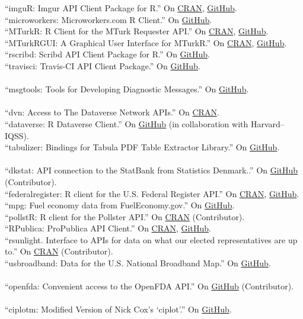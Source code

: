 \documentclass[12pt]{article}
\newcommand{\topic}[1]{\pagebreak[3]\indent {\color{lg}{\footnotesize #1 }}\\}
\newcommand{\entry}[1]{\indent {\color{lg}\guillemotright}\hspace{2pt}#1\vspace{.25em}\\}
\begin{document}
	\entry{``imguR: Imgur API Client Package for R.'' On \href{https://cran.r-project.org/package=imguR}{CRAN}, \href{https://github.com/cloudyr/imguR}{GitHub}.}
	\entry{``microworkers: Microworkers.com R Client.'' On \href{https://github.com/cloudyr/microworkers}{GitHub}.}
	\entry{``MTurkR: R Client for the MTurk Requester API.'' On \href{https://cran.r-project.org/package=MTurkR}{CRAN}, \href{https://github.com/leeper/MTurkR}{GitHub}.}
	\entry{``MTurkRGUI: A Graphical User Interface for MTurkR.'' On \href{https://cran.r-project.org/package=MTurkRGUI}{CRAN}, \href{https://github.com/leeper/MTurkRGUI}{GitHub}.}
	\entry{``rscribd: Scribd API Client Package for R.'' On \href{https://github.com/cloudyr/rscribd}{GitHub}.}
	\entry{``travisci: Travis-CI API Client Package.'' On \href{https://github.com/cloudyr/travisci}{GitHub}.}
\topic{R packages contributed to RL10N}
	\entry{``msgtools: Tools for Developing Diagnostic Messages.'' On \href{https://github.com/RL10N/msgtools}{GitHub}.}
\topic{R packages contributed to the rOpenSci project}
	\entry{``dvn: Access to The Dataverse Network APIs.'' On \href{https://cran.r-project.org/package=dvn}{CRAN}.}
	\entry{``dataverse: R Dataverse Client.'' On \href{https://github.com/iqss/dataverse-client-r}{GitHub} (in collaboration with Harvard--IQSS).}
	\entry{``tabulizer: Bindings for Tabula PDF Table Extractor Library.'' On \href{https://github.com/ropenscilabs/tabulizer}{GitHub}.}
\topic{R packages contributed to the rOpenGov project}
	\entry{``dkstat: API connection to the StatBank from Statistics Denmark..'' On \href{https://github.com/rOpenGov/dkstat}{GitHub} (Contributor).}
	\entry{``federalregister: R client for the U.S. Federal Register API.'' On \href{https://cran.r-project.org/package=federalregister}{CRAN}, \href{https://github.com/rOpenGov/federalregister}{GitHub}.}
	\entry{``mpg: Fuel economy data from FuelEconomy.gov.'' On \href{https://github.com/rOpenGov/mpg}{GitHub}.}
	\entry{``pollstR: R client for the Pollster API.'' On \href{https://cran.r-project.org/package=pollstR}{CRAN} (Contributor).}
	\entry{``RPublica: ProPublica API Client.'' On \href{https://cran.r-project.org/package=RPublica}{CRAN}, \href{https://github.com/rOpenGov/RPublica}{GitHub}.}
	\entry{``rsunlight. Interface to APIs for data on what our elected representatives are up to.'' On \href{https://cran.r-project.org/package=rsunlight}{CRAN} (Contributor).}
	\entry{``usbroadband: Data for the U.S. National Broadband Map.'' On \href{https://github.com/rOpenGov/usbroadband}{GitHub}.}
\topic{R packages contributed to the rOpenHealth project}
	\entry{``openfda: Convenient access to the OpenFDA API.'' On \href{https://github.com/ropenhealth/openfda}{GitHub} (Contributor).}
\topic{Stata Packages}
	\entry{``ciplotm: Modified Version of Nick Cox's `ciplot'.'' On \href{https://github.com/leeper/ciplotm}{GitHub}.}
\end{document}
